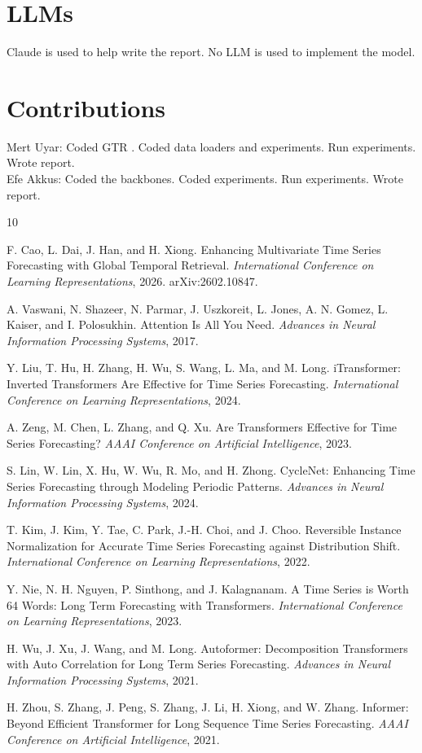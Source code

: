\documentclass[11pt]{article}
\begin{document}
\section{LLMs}
Claude is used to help write the report. No LLM is used to implement the model.

\section*{Contributions}
Mert Uyar: Coded GTR \cite{cao2026gtr}. Coded data loaders and experiments. Run experiments. Wrote report. \\
Efe Akkus: Coded the backbones. Coded experiments. Run experiments. Wrote report.

\begin{thebibliography}{10}

F. Cao, L. Dai, J. Han, and H. Xiong. Enhancing Multivariate Time Series Forecasting with Global Temporal Retrieval.
\textit{International Conference on Learning Representations}, 2026. arXiv:2602.10847.

A. Vaswani, N. Shazeer, N. Parmar, J. Uszkoreit, L. Jones, A. N. Gomez, L. Kaiser, and
I. Polosukhin. Attention Is All You Need. \textit{Advances in Neural Information Processing
Systems}, 2017.

Y. Liu, T. Hu, H. Zhang, H. Wu, S. Wang, L. Ma, and M. Long. iTransformer: Inverted Transformers
Are Effective for Time Series Forecasting. \textit{International Conference on Learning
Representations}, 2024.

A. Zeng, M. Chen, L. Zhang, and Q. Xu. Are Transformers Effective for Time Series Forecasting?
\textit{AAAI Conference on Artificial Intelligence}, 2023.

S. Lin, W. Lin, X. Hu, W. Wu, R. Mo, and H. Zhong. CycleNet: Enhancing Time Series Forecasting
through Modeling Periodic Patterns. \textit{Advances in Neural Information Processing Systems},
2024.

T. Kim, J. Kim, Y. Tae, C. Park, J.-H. Choi, and J. Choo. Reversible Instance Normalization for
Accurate Time Series Forecasting against Distribution Shift. \textit{International Conference on
Learning Representations}, 2022.

Y. Nie, N. H. Nguyen, P. Sinthong, and J. Kalagnanam. A Time Series is Worth 64 Words: Long Term
Forecasting with Transformers. \textit{International Conference on Learning Representations}, 2023.

H. Wu, J. Xu, J. Wang, and M. Long. Autoformer: Decomposition Transformers with Auto Correlation
for Long Term Series Forecasting. \textit{Advances in Neural Information Processing Systems}, 2021.

H. Zhou, S. Zhang, J. Peng, S. Zhang, J. Li, H. Xiong, and W. Zhang. Informer: Beyond Efficient
Transformer for Long Sequence Time Series Forecasting. \textit{AAAI Conference on Artificial
Intelligence}, 2021.

\end{thebibliography}
\end{document}
